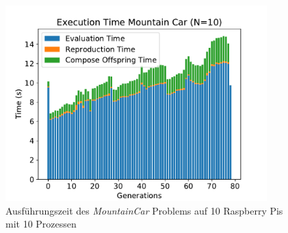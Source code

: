 \begin{figure}[!h]
	\centering
	\includegraphics[width=0.9\textwidth]{./img/mountain_car_analysis/1413_time_10cores_10pis.pdf} 
	\caption{Ausführungszeit des \emph{MountainCar} Problems auf 10 Raspberry Pis mit 10 Prozessen}
	\label{fig:mountain_car_time_10cores_10pi}
\end{figure}
\\ \noindent
